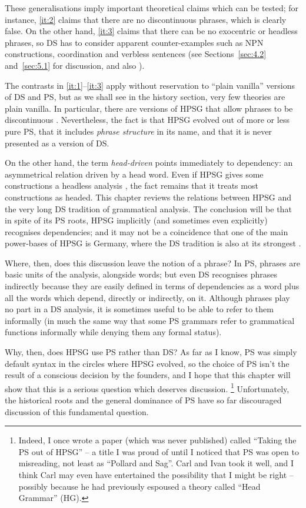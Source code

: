 \documentclass[output=paper
	        ,collection
	        ,collectionchapter
 	        ,biblatex
                ,babelshorthands
                ,newtxmath
                ,draftmode
                ,colorlinks, citecolor=brown
]{./langsci/langscibook}
\begin{document}
These generalisations imply important theoretical claims which can be tested; for instance, \ref{it:2} claims that there are no discontinuous phrases, which is clearly false. On the other hand, \ref{it:3} claims that there can be no exocentric or headless phrases, so DS has to consider apparent counter-examples such as NPN constructions, coordination and verbless sentences (see Sections~\ref{sec:4.2} and~\ref{sec:5.1} for discussion, and also ).

The contrasts in \ref{it:1}--\ref{it:3} apply without reservation to ``plain vanilla'' \citep{Zwicky1985} versions of DS and PS, but as we shall see in the history section, very few theories are plain vanilla. In particular, there are versions of HPSG that allow phrases to be discontinuous \citep{Reape94a,Kathol2000a,Mueller95c,Babel}. Nevertheless, the fact is that HPSG evolved out of more or less pure PS, that it includes \emph{phrase structure} in its name, and that it is never presented as a version of DS.

On the other hand, the term \emph{head-driven} points immediately to dependency: an asymmetrical relation driven by a head word. Even if HPSG gives some constructions a headless analysis \citep[654--666]{MuellerGT-Eng2}, the fact remains that it treats most constructions as headed.
This chapter reviews the relations between HPSG and the very long DS tradition of grammatical analysis. The conclusion will be that in spite of its PS roots, HPSG implicitly (and sometimes even explicitly) recognises dependencies; and it may not be a coincidence that one of the main power-bases of HPSG is Germany, where the DS tradition is also at its strongest  \citep[359]{MuellerGT-Eng2}.

Where, then, does this discussion leave the notion of a phrase? In PS, phrases are basic units of the analysis, alongside words; but even DS recognises phrases indirectly because they are easily defined in terms of dependencies as a word plus all the words which depend, directly or indirectly, on it. Although phrases play no part in a DS analysis, it is sometimes useful to be able to refer to them informally (in much the same way that some PS grammars refer to grammatical functions informally while denying them any formal status).

Why, then, does HPSG use PS rather than DS? As far as I know, PS was simply default syntax in the circles where HPSG evolved, so the choice of PS isn’t the result of a conscious decision by the founders, and I hope that this chapter will show that this is a serious question which deserves discussion.%
%
\footnote{Indeed, I once wrote a paper (which was never published) called ``Taking the PS out of HPSG'' – a title I was proud of until I noticed that PS was open to misreading, not least as ``Pollard and Sag''. Carl and Ivan took it well, and I think Carl may even have entertained the possibility that I might be right – possibly because he had previously espoused a theory called ``Head Grammar'' (HG).}%
%
Unfortunately, the historical roots and the general dominance of PS have so far discouraged discussion of this fundamental question.
\end{document}
